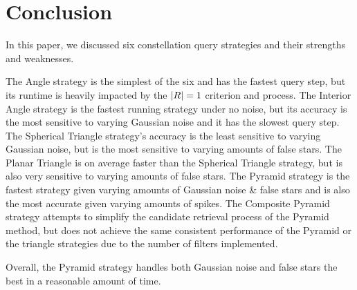 \section{Conclusion}\label{sec:conclusion}
In this paper, we discussed six constellation query strategies and their strengths and weaknesses.

The Angle strategy is the simplest of the six and has the fastest query step, but its runtime is heavily impacted by the $\left| R \right| = 1$ criterion and  process.
The Interior Angle strategy is the fastest running strategy under no noise, but its accuracy is the most sensitive to varying Gaussian noise and it has the slowest query step.
The Spherical Triangle strategy's accuracy is the least sensitive to varying Gaussian noise, but is the most sensitive to varying amounts of false stars.
The Planar Triangle is on average faster than the Spherical Triangle strategy, but is also very sensitive to varying amounts of false stars.
The Pyramid strategy is the fastest strategy given varying amounts of Gaussian noise \& false stars and is also the most accurate given varying amounts of spikes.
The Composite Pyramid strategy attempts to simplify the candidate retrieval process of the Pyramid method, but does not achieve the same consistent performance of the Pyramid or the triangle strategies due to the number of filters implemented.

Overall, the Pyramid strategy handles both Gaussian noise and false stars the best in a reasonable amount of time.
